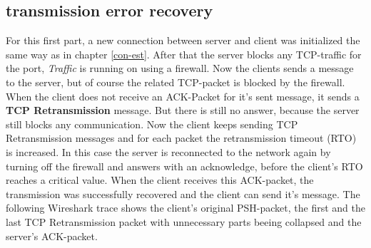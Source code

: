 \subsection{transmission error recovery}
For this first part, a new connection between server and client was initialized the same way as in chapter \ref{con-est}. After that the server blocks any TCP-traffic for the port, \textit{Traffic} is running on using a firewall. Now the clients sends a message to the server, but of course the related TCP-packet is blocked by the firewall. When the client does not receive an ACK-Packet for it's sent message, it sends a \textbf{TCP Retransmission} message. But there is still no answer, because the server still blocks any communication. Now the client keeps sending TCP Retransmission messages and for each packet the retransmission timeout (RTO) is increased. In this case the server is reconnected to the network again by turning off the firewall and answers with an acknowledge, before the client's RTO reaches a critical value. When the client receives this ACK-packet, the transmission was successfully recovered and the client can send it's message. The following Wireshark trace shows the client's original PSH-packet, the first and the last TCP Retransmission packet with unnecessary parts beeing collapsed and the server's ACK-packet. 
\\
